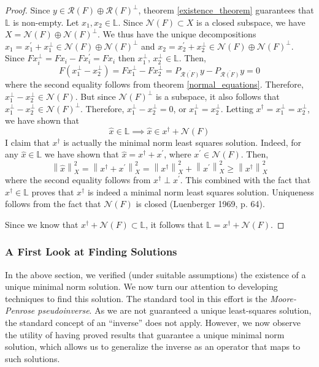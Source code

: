\documentclass[12pt]{article}
\newcommand*{\norm}[1]{\left\lVert#1\right\rVert}
\newcommand{\R}{\mathcal{R}}
\newcommand{\N}{\mathcal{N}}
\begin{document}
\begin{proof} 
Since $y \in \R(F) \oplus \R(F)^\perp$, theorem \ref{existence_theorem} guarantees that $\mathbb{L}$ is non-empty. Let $x_1, x_2 \in \mathbb{L}$. 
Since $\N(F) \subset X$ is a closed subspace, we have $X = \N(F) \oplus \N(F)^\perp$. We thus have the unique decompositions
$x_1 = x_1^\prime + x_1^\perp \in \N(F) \oplus \N(F)^\perp$ and $x_2 = x_2^\prime + x_2^\perp \in \N(F) \oplus \N(F)^\perp$. Since 
$Fx_i^\perp = Fx_i - Fx_i^\prime = Fx_i$ then $x_1^\perp$, $x_2^\perp \in \mathbb{L}$. Then, 
\[F(x_1^\perp - x_2^\perp) = Fx_1^\perp - Fx_2^\perp = P_{\overline{\R(F)}}y - P_{\overline{\R(F)}}y = 0\]
where the second equality follows from theorem \ref{normal_equations}. Therefore, $x_1^\perp - x_2^\perp \in \N(F)$. 
But since $\N(F)^\perp$ is a subspace, it also follows that $x_1^\perp - x_2^\perp \in \N(F)^\perp$. Therefore, 
$x_1^\perp - x_2^\perp = 0$, or $x_1^\perp = x_2^\perp$. Letting $x^\dagger = x_1^\perp = x_2^\perp$, we have shown that
\[\hat{x} \in \mathbb{L} \implies \hat{x} \in x^\dagger + \N(F)\]
I claim that $x^\dagger$ is actually the minimal norm least squares solution. Indeed, for any $\hat{x} \in \mathbb{L}$ we have
shown that $\hat{x} = x^\dagger + x^\prime$, where $x^\prime \in \N(F)$. Then, 
\[\norm{\hat{x}}_X^2 = \norm{x^\dagger + x^\prime}_X^2 = \norm{x^\dagger}_X^2 + \norm{x^\prime}_X^2 \geq \norm{x^\dagger}_X^2\]
where the second equality follows from $x^\dagger \perp x^\prime$. This combined with the fact that $x^\dagger \in \mathbb{L}$ proves that
$x^\dagger$ is indeed a minimal norm least squares solution. Uniqueness follows from the fact that $\N(F)$ is closed (Luenberger 1969, p. 64). 

Since we know that $x^\dagger + \N(F) \subset \mathbb{L}$, it follows that $\mathbb{L} = x^\dagger + \N(F)$. 
\end{proof} 

\subsubsection{A First Look at Finding Solutions}
 
In the above section, we verified (under suitable assumptions) the existence of a unique minimal norm solution. 
We now turn our attention to developing techniques to find this solution. The standard tool in this effort is the 
\textit{Moore-Penrose pseudoinverse}. As we are not guaranteed a unique least-squares solution, 
the standard concept of an ``inverse'' does not apply. However, we now observe the utility of having 
proved results that guarantee a unique minimal norm solution, which allows us to generalize the 
inverse as an operator that maps to such solutions. 
 
\end{document}
